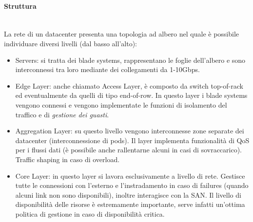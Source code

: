 \documentclass{article}
\providecommand{\tightlist}{%
		  \setlength{\itemsep}{0pt}\setlength{\parskip}{0pt}}
\begin{document}
		\hypertarget{struttura}{%
		\paragraph{Struttura}\label{struttura}}\mbox{}\\
		La rete di un datacenter presenta una topologia ad albero nel
		quale è possibile individuare diversi livelli (dal basso all'alto):
		
		\begin{itemize}
		\tightlist
		\item
		  Servers: si tratta dei blade systems,
		  rappresentano le foglie dell'albero e sono interconnessi tra
		  loro mediante dei collegamenti da 1-10Gbps.
		\item
		  Edge Layer: anche chiamato Access Layer, è
		  composto da switch top-of-rack ed eventualmente da
		  quelli di tipo end-of-row. In questo layer i
		  blade systems vengono connessi e vengono implementate
		  le funzioni di isolamento del traffico e di \emph{gestione dei
		  guasti}.
		\item
		  Aggregation Layer: su questo livello vengono
		  interconnesse zone separate dei datacenter
		  (interconnessione di pods). Il layer implementa
		  funzionalità di QoS per i flussi dati (è possibile
		  anche rallentarne alcuni in casi di sovraccarico). Traffic shaping in
		  caso di overload.
		\item
		  Core Layer: in questo layer si lavora
		  esclusivamente a livello di rete. Gestisce tutte le
		  connessioni con l'esterno e
		  l'instradamento in caso di failures (quando alcuni
		  link non sono disponibili), inoltre interagisce con la
		  SAN. Il livello di disponibilità delle risorse è estremamente
		  importante, serve infatti un'ottima politica di gestione in caso di
		  disponibilità critica.
		\end{itemize}
		
\end{document}
